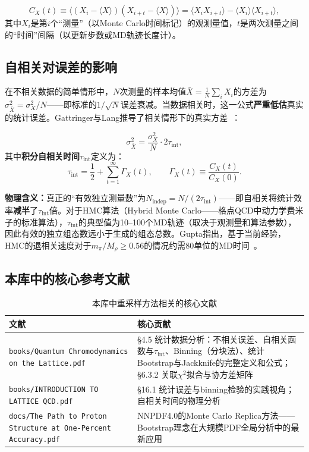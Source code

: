 \documentclass[12pt,a4paper]{ctexart}
\theoremstyle{definition}
\begin{document}
\begin{equation}
C_X(t) \equiv \langle (X_i - \langle X\rangle)(X_{i+t} - \langle X\rangle) \rangle = \langle X_i X_{i+t} \rangle - \langle X_i\rangle\langle X_{i+t}\rangle,
\label{eq:autocorr_func}
\end{equation}
其中$X_i$是第$i$个``测量''（以Monte Carlo时间标记）的观测量值，$t$是两次测量之间的``时间''间隔（以更新步数或MD轨迹长度计）。

\subsection{自相关对误差的影响}

在不相关数据的简单情形中，$N$次测量的样本均值$\bar X = \frac{1}{N}\sum_i X_i$的方差为$\sigma^2_{\bar X} = \sigma_X^2 / N$——即标准的$1/\sqrt{N}$误差衰减。当数据相关时，这一公式\textbf{严重低估}真实的统计误差。Gattringer与Lang推导了相关情形下的真实方差~\cite{GattringerLang2010}：

\begin{equation}
\boxed{\sigma^2_{\bar X} = \frac{\sigma_X^2}{N} \cdot 2\tau_{\text{int}}},
\label{eq:correlated_variance}
\end{equation}
其中\textbf{积分自相关时间}$\tau_{\text{int}}$定义为：
\begin{equation}
\tau_{\text{int}} = \frac{1}{2} + \sum_{t=1}^\infty \Gamma_X(t), \qquad \Gamma_X(t) \equiv \frac{C_X(t)}{C_X(0)}.
\label{eq:tau_int}
\end{equation}

\textbf{物理含义：}真正的``有效独立测量数''为$N_{\text{indep}} = N/(2\tau_{\text{int}})$——即自相关将统计效率\textbf{减半}了$\tau_{\text{int}}$倍。对于HMC算法（Hybrid Monte Carlo——格点QCD中动力学费米子的标准算法），$\tau_{\text{int}}$的典型值为10--100个MD轨迹（取决于观测量和算法参数），因此有效的独立组态数远小于生成的组态总数。Gupta指出，基于当前经验，HMC的退相关速度对于$m_\pi/M_\rho \ge 0.56$的情况约需80单位的MD时间~\cite{Gupta1997intro}。

\subsection{本库中的核心参考文献}

\begin{table}[H]
\centering
\caption{本库中重采样方法相关的核心文献}
\label{tab:rs_papers}
\small
\begin{tabular}{lp{9cm}}
\toprule
文献 & 核心贡献 \\
\midrule
\texttt{books/Quantum Chromodynamics on the Lattice.pdf} & §4.5 统计数据分析：不相关误差、自相关函数与$\tau_{\text{int}}$、Binning（分块法）、统计Bootstrap与Jackknife的完整定义和公式；§6.3.2 关联$\chi^2$拟合与协方差矩阵 \\
\texttt{books/INTRODUCTION TO LATTICE QCD.pdf} & §16.1 统计误差与binning检验的实践视角；自相关时间的物理分析 \\
\texttt{docs/The Path to Proton Structure at One-Percent Accuracy.pdf} &
NNPDF4.0的Monte Carlo Replica方法——Bootstrap理念在大规模PDF全局分析中的最新应用 \\
\bottomrule
\end{tabular}
\end{table}
\end{document}
